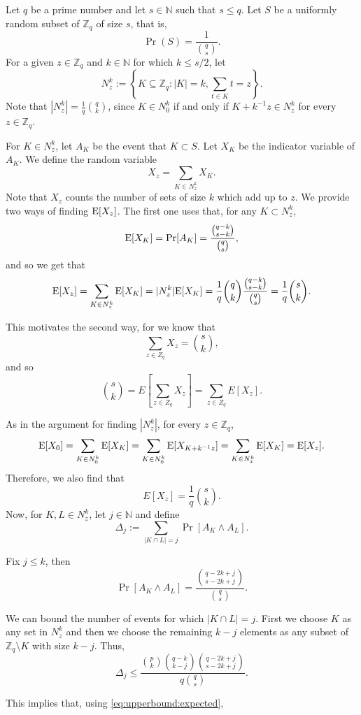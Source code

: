 Let $q$ be a prime number and let $s \in \mathbb{N}$ such that $s\leq q$. Let $S$ be a uniformly random subset of $\mathbb{Z}_q$ of size $s$, that is, 
\[\Pr(S) = \frac{1}{\binom{q}{s}}.\]
For a given $z \in \mathbb{Z}_q$ and $k \in \mathbb{N}$ for which $k \leq s/2$, let 
\[N_z^k := \left\{K \subseteq \mathbb{Z}_q: |K| = k, \sum_{t \in K} t = z\right\}.\]
Note that $|N_z^k| = \frac{1}{q}{\binom{q}{k}}$, since $K \in N_0^k$ if and only if $K + k^{-1}z \in N_z^k$ for every $z \in \mathbb{Z}_q$.\par
For $K \in N_z^k$, let $A_K$ be the event that $K \subset S$. Let $X_K$ be the indicator variable of $A_K$.
We define the random variable 
\[X_z = \sum_{K \in N_z^k} X_K.\]
Note that $X_z$ counts the number of sets of size $k$ which add up to $z$. We provide two ways of finding $\mathrm{E}[X_z]$. The first one uses that, for any $K \subset N^k_z$, 
\[\mathrm{E}[X_K] = \mathrm{Pr}[A_K] = \frac{\binom{q - k}{s - k}}{\binom{q}{s}},\]
and so we get that
\begin{align*}
    \mathrm{E}[X_z] = \sum_{K \in N_z^k} \mathrm{E}[X_K] = |N_z^k|\mathrm{E}[X_K] = \frac{1}{q}{\binom{q}{k}}\frac{\binom{q - k}{s - k}}{\binom{q}{s}} = \frac{1}{q} {\binom{s}{k}}.
\end{align*}
\par
This motivates the second way, for we know that 
\[\sum_{z \in Z_q} X_z = {\binom{s}{k}},\]
and so
\[\binom{s}{k} = E\left[\sum_{z \in Z_q} X_z\right] =  \sum_{z \in Z_q} E[X_z].\]\par
As in the argument for finding $|N_z^k|$, for every $z \in \mathbb{Z}_q$, 
\[\mathrm{E}[X_0] = \sum_{K \in N_0^k}\mathrm{E}[X_K] = \sum_{K \in N_0^k} \mathrm{E}[X_{K + k^{-1}z}] = \sum_{K \in N_z^k} \mathrm{E}[X_K] = \mathrm{E}[X_z].\]
Therefore, we also find that
\begin{equation}\label{eq:upperbound:expected}
E[X_z] = \frac{1}{q} {\binom{s}{k}}.
\end{equation}
Now, for $K, L \in N_z^k$, let $j \in \mathbb{N}$ and define
\[\Delta_j := \sum_{|K \cap L| = j} \Pr[A_K \land A_L].\]
\par Fix $j \leq k$, then 
\[\Pr[A_K \land A_L] = \frac{\binom{q - 2k + j}{s - 2k + j}}{\binom{q}{s}}.\]
\par
We can bound the number of events for which $|K \cap L| = j$. First we choose $K$ as any set in $N_z^k$ and then we choose the remaining $k- j$ elements as any subset of $\mathbb{Z}_q \setminus K$ with size $k - j$. Thus, 
\[\Delta_j \leq \frac{\binom{p}{k} \binom{q - k}{k - j}\binom{q - 2k + j}{s - 2k + j}}{q\binom{q}{s}}.\]
\par This implies that, using \ref{eq:upperbound:expected},

